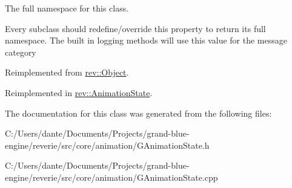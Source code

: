 The full namespace for this class. 

Every subclass should redefine/override this property to return its full namespace. The built in logging methods will use this value for the message category 

Reimplemented from \mbox{\hyperlink{classrev_1_1_object_aaeb638d3e10f361c56c211a318a27f3d}{rev\+::\+Object}}.



Reimplemented in \mbox{\hyperlink{classrev_1_1_animation_state_abaccd2a331d4b77be5942e5e907be3dc}{rev\+::\+Animation\+State}}.



The documentation for this class was generated from the following files\+:\begin{DoxyCompactItemize}
\item 
C\+:/\+Users/dante/\+Documents/\+Projects/grand-\/blue-\/engine/reverie/src/core/animation/G\+Animation\+State.\+h\item 
C\+:/\+Users/dante/\+Documents/\+Projects/grand-\/blue-\/engine/reverie/src/core/animation/G\+Animation\+State.\+cpp\end{DoxyCompactItemize}
